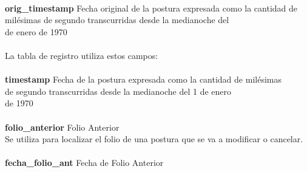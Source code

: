 \documentclass[11pt]{article}
\numberwithin{equation}{section} %
\begin{document}
\begin{tabbing}
\\
\textbf{orig\_timestamp} \> Fecha original de la postura expresada como la cantidad de\\
\> milésimas de segundo transcurridas desde la medianoche del\\
 de enero de 1970\\
\\
La tabla de registro utiliza estos campos:\\
\\
\textbf{timestamp} \> Fecha de la postura expresada como la cantidad de milésimas\\
\> de segundo transcurridas desde la medianoche del 1 de enero\\
\>de 1970\\
\\
\textbf{folio\_anterior} \> Folio Anterior\\
Se utiliza para localizar el folio de una postura que se va a modificar o cancelar.\\
\\
\textbf{fecha\_folio\_ant} \> Fecha de Folio Anterior\\
\end{tabbing}
\end{document}
